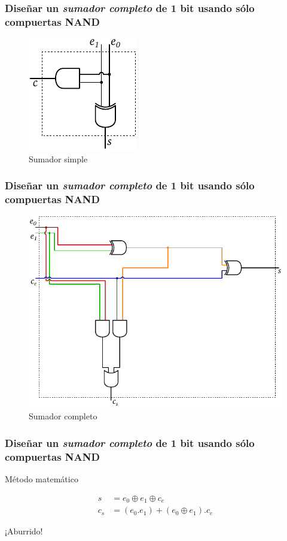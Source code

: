 \documentclass[mathserif,hyperref]{beamer}
\begin{document}
\begin{frame}
\frametitle{\small Diseñar un \textit{sumador completo} de 1 bit usando sólo
compuertas NAND}
\begin{figure}[htp]
  \caption{Sumador simple}
  \includegraphics[scale=0.9]{sumador-simple.pdf}
\end{figure}
\end{frame}


\begin{frame}
\frametitle{\small Diseñar un \textit{sumador completo} de 1 bit usando sólo
compuertas NAND}
\begin{figure}[htp]
  \caption{Sumador completo}
  \includegraphics[scale=0.7]{sumador-completo.pdf}
\end{figure}
\end{frame}


\begin{frame}
\frametitle{\small Diseñar un \textit{sumador completo} de 1 bit usando sólo
compuertas NAND}
\begin{center}Método matemático\end{center}
\begin{align*}
  s   &= e_0 \oplus e_1 \oplus c_e \\
  c_s &= (e_0 . e_1) + (e_0 \oplus e_1) . c_e
\end{align*}
\begin{center}{\Large ¡Aburrido!}\end{center}
\end{frame}
\end{document}
